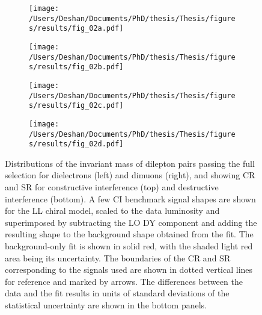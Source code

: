 \begin{figure}[!htpb]
    \centering
    \begin{subfigure}[b]{0.49\textwidth}
        \centering
        \texttt{[image: /Users/Deshan/Documents/PhD/thesis/Thesis/figures/results/fig\_02a.pdf]}
        \label{fig:fits1}
    \end{subfigure}
    \begin{subfigure}[b]{0.49\textwidth}
        \centering
        \texttt{[image: /Users/Deshan/Documents/PhD/thesis/Thesis/figures/results/fig\_02b.pdf]}
        \label{fig:fits2}
    \end{subfigure}
    \begin{subfigure}[b]{0.49\textwidth}
        \centering
        \texttt{[image: /Users/Deshan/Documents/PhD/thesis/Thesis/figures/results/fig\_02c.pdf]}
        \label{fig:fits3}
    \end{subfigure}
    \begin{subfigure}[b]{0.49\textwidth}
        \centering
        \texttt{[image: /Users/Deshan/Documents/PhD/thesis/Thesis/figures/results/fig\_02d.pdf]}
        \label{fig:fits4}
    \end{subfigure}
    \caption[Distributions of the invariant mass of dilepton pairs passing the full selection for dielectrons and dimuons. Where the background-only fit has been performed in the CR and extrapolated to the signal region.]{
    Distributions of the invariant mass of dilepton pairs passing the full selection for dielectrons (left) and dimuons (right), and showing CR and SR for constructive interference (top) and destructive interference (bottom).
    A few CI benchmark signal shapes are shown for the LL chiral model, scaled to the data luminosity and superimposed by subtracting the LO DY component and adding the resulting shape to the background shape obtained from the fit.
    The background-only fit is shown in solid red, with the shaded light red area being its uncertainty.
    The boundaries of the CR and SR corresponding to the signals used are shown in dotted vertical lines for reference and marked by arrows.
    The differences between the data and the fit results in units of standard deviations of the statistical uncertainty are shown in the bottom panels.
    }
    \label{fig:fits}
\end{figure}


